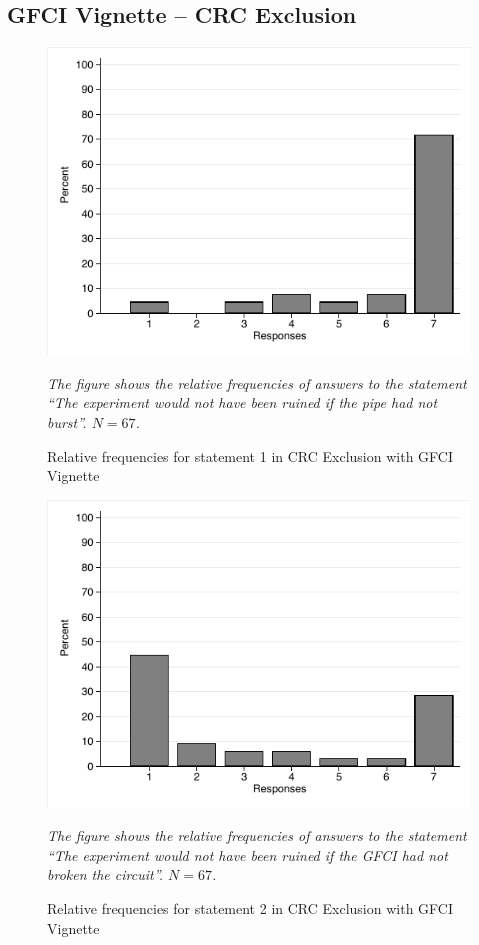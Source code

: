 \documentclass[egregdoesnotlikesansseriftitles,12pt]{scrartcl}
\begin{document}
\subsection{GFCI Vignette -- CRC Exclusion}
\begin{figure}[H]
   \centering
   \includegraphics[scale=0.8]{figures/cir_crc_hist_1.pdf}
   \begin{minipage}{0.9\linewidth}
   \footnotesize
   \emph{The figure shows the relative frequencies of answers to the statement ``The experiment would not have been ruined if the pipe had not burst''. $N=67$.}
   \end{minipage}
   \caption{Relative frequencies for statement 1 in CRC Exclusion with GFCI Vignette}
   \label{fig:cir_crc_hist_1}
\end{figure}

\begin{figure}[H]
   \centering
   \includegraphics[scale=0.8]{figures/cir_crc_hist_2.pdf}
   \begin{minipage}{0.9\linewidth}
   \footnotesize
   \emph{The figure shows the relative frequencies of answers to the statement ``The experiment would not have been ruined if the GFCI had not broken the circuit''. $N=67$.}
   \end{minipage}
   \caption{Relative frequencies for statement 2 in CRC Exclusion with GFCI Vignette}
   \label{fig:cir_crc_hist_2}
\end{figure}
\end{document}
